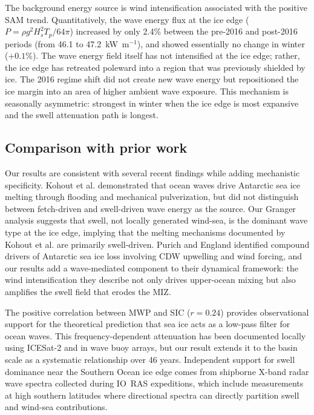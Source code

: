 \documentclass[11pt]{article}
\begin{document}
The background energy source is wind intensification associated with the positive SAM trend\cite{Marshall2003}. Quantitatively, the wave energy flux at the ice edge ($P = \rho g^2 H_s^2 T_p / 64\pi$) increased by only 2.4\% between the pre-2016 and post-2016 periods (from 46.1 to 47.2~kW~m$^{-1}$), and showed essentially no change in winter ($+0.1$\%). The wave energy field itself has not intensified at the ice edge; rather, the ice edge has retreated poleward into a region that was previously shielded by ice. The 2016 regime shift did not create new wave energy but repositioned the ice margin into an area of higher ambient wave exposure. This mechanism is seasonally asymmetric: strongest in winter when the ice edge is most expansive and the swell attenuation path is longest.

\subsection{Comparison with prior work}

Our results are consistent with several recent findings while adding mechanistic specificity. Kohout et al.\cite{Kohout2026} demonstrated that ocean waves drive Antarctic sea ice melting through flooding and mechanical pulverization, but did not distinguish between fetch-driven and swell-driven wave energy as the source. Our Granger analysis suggests that swell, not locally generated wind-sea, is the dominant wave type at the ice edge, implying that the melting mechanisms documented by Kohout et al. are primarily swell-driven. Purich and England\cite{Purich2026} identified compound drivers of Antarctic sea ice loss involving CDW upwelling and wind forcing, and our results add a wave-mediated component to their dynamical framework: the wind intensification they describe not only drives upper-ocean mixing but also amplifies the swell field that erodes the MIZ.

The positive correlation between MWP and SIC ($r = 0.24$) provides observational support for the theoretical prediction that sea ice acts as a low-pass filter for ocean waves\cite{Squire2020}. This frequency-dependent attenuation has been documented locally using ICESat-2\cite{Womack2022} and in wave buoy arrays, but our result extends it to the basin scale as a systematic relationship over 46 years. Independent support for swell dominance near the Southern Ocean ice edge comes from shipborne X-band radar wave spectra collected during IO~RAS expeditions\cite{Ezhova2025}, which include measurements at high southern latitudes where directional spectra can directly partition swell and wind-sea contributions.
\end{document}
